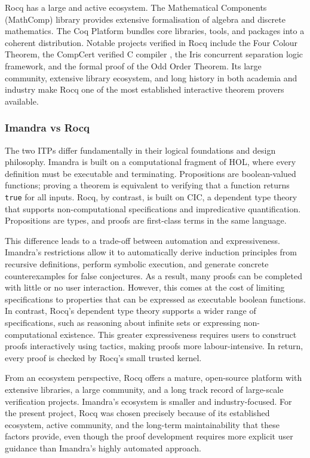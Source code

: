 Rocq has a large and active ecosystem. The Mathematical Components (MathComp) library provides extensive formalisation of algebra and discrete mathematics. The Coq Platform bundles core libraries, tools, and packages into a coherent distribution. Notable projects verified in Rocq include the Four Colour Theorem, the CompCert verified C compiler \cite{compcert_rocq}, the Iris concurrent separation logic framework, and the formal proof of the Odd Order Theorem. Its large community, extensive library ecosystem, and long history in both academia and industry make Rocq one of the most established interactive theorem provers available.

\subsubsection{Imandra vs Rocq}

The two ITPs differ fundamentally in their logical foundations and design philosophy. Imandra is built on a computational fragment of HOL, where every definition must be executable and terminating. Propositions are boolean-valued functions; proving a theorem is equivalent to verifying that a function returns \texttt{true} for all inputs. Rocq, by contrast, is built on CIC, a dependent type theory that supports non-computational specifications and impredicative quantification. Propositions are types, and proofs are first-class terms in the same language.

This difference leads to a trade-off between automation and expressiveness. Imandra's restrictions allow it to automatically derive induction principles from recursive definitions, perform symbolic execution, and generate concrete counterexamples for false conjectures. As a result, many proofs can be completed with little or no user interaction. However, this comes at the cost of limiting specifications to properties that can be expressed as executable boolean functions. In contrast, Rocq's dependent type theory supports a wider range of specifications, such as reasoning about infinite sets or expressing non-computational existence. This greater expressiveness requires users to construct proofs interactively using tactics, making proofs more labour-intensive. In return, every proof is checked by Rocq's small trusted kernel.

From an ecosystem perspective, Rocq offers a mature, open-source platform with extensive libraries, a large community, and a long track record of large-scale verification projects. Imandra's ecosystem is smaller and industry-focused. For the present project, Rocq was chosen precisely because of its established ecosystem, active community, and the long-term maintainability that these factors provide, even though the proof development requires more explicit user guidance than Imandra's highly automated approach.

